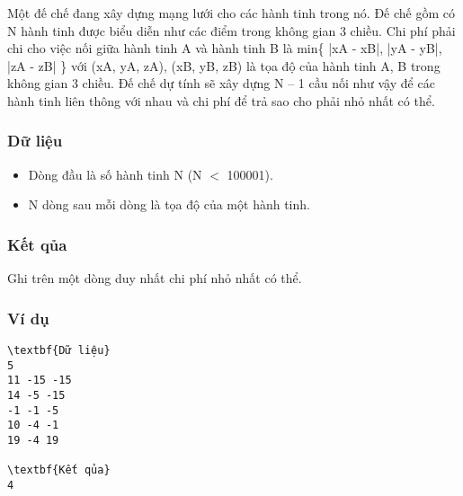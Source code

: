 







   Một đế chế đang xây dựng mạng lưới cho các hành tinh trong nó. Đế chế gồm có N hành tinh được biểu diễn như các điểm trong không gian 3 chiều. Chi phí phải chi cho việc nối giữa hành tinh A và hành tinh B là min\{ |xA - xB|, |yA - yB|, |zA - zB| \} với (xA, yA, zA), (xB, yB, zB) là tọa độ của hành tinh A, B trong không gian 3 chiều. Đế chế dự tính sẽ xây dựng N – 1 cầu nối như vậy để các hành tinh liên thông với nhau và chi phí để trả sao cho phải nhỏ nhất có thể.  

\subsubsection{   Dữ liệu  }
\begin{itemize}
	\item     Dòng đầu là số hành tinh N (N $<$ 100001).   
	\item     N dòng sau mỗi dòng là tọa độ của một hành tinh.   
\end{itemize}

\subsubsection{   Kết qủa  }

   Ghi trên một dòng duy nhất chi phí nhỏ nhất có thể.  

\subsubsection{   Ví dụ  }
\begin{verbatim}
\textbf{Dữ liệu} 
5
11 -15 -15
14 -5 -15
-1 -1 -5
10 -4 -1
19 -4 19

\textbf{Kết qủa} 
4 
\end{verbatim}

